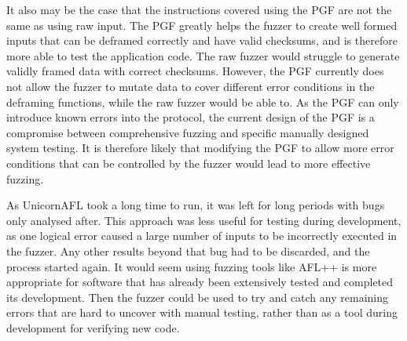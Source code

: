 \documentclass[../report.tex]{subfiles}
\begin{document}
It also may be the case that the instructions covered using the PGF are not the
same as using raw input. The PGF greatly helps the fuzzer to create well formed
inputs that can be deframed correctly and have valid checksums, and is
therefore more able to test the application code. The raw fuzzer would struggle
to generate validly framed data with correct checksums. However, the PGF
currently does not allow the fuzzer to mutate data to cover different error
conditions in the deframing functions, while the raw fuzzer would be able to.
As the PGF can only introduce known errors into the protocol, the current
design of the PGF is a compromise between comprehensive fuzzing and specific
manually designed system testing. It is therefore likely that modifying the PGF
to allow more error conditions that can be controlled by the fuzzer would lead
to more effective fuzzing.

As UnicornAFL took a long time to run, it was left for long periods with bugs
only analysed after. This approach was less useful for testing during
development, as one logical error caused a large number of inputs to be
incorrectly executed in the fuzzer. Any other results beyond that bug had to be
discarded, and the process started again. It would seem using fuzzing tools
like AFL++ is more appropriate for software that has already been extensively
tested and completed its development. Then the fuzzer could be used to try and
catch any remaining errors that are hard to uncover with manual testing, rather
than as a tool during development for verifying new code.



\end{document}
